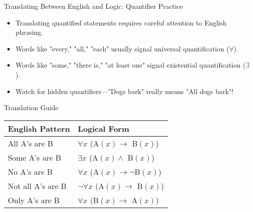 \documentclass{beamer}
\begin{document}
	\begin{frame}{Translating Between English and Logic: Quantifier Practice}
		\begin{itemize}
			\item Translating quantified statements requires careful attention to English phrasing.
			\item Words like "every," "all," "each" usually signal universal quantification ($\forall$).
			\item Words like "some," "there is," "at least one" signal existential quantification ($\exists$).
			\item Watch for hidden quantifiers—"Dogs bark" really means "All dogs bark"!
		\end{itemize}
		
		\begin{block}{Translation Guide}
			\small
			\begin{tabular}{|l|l|}
				\hline
				\textbf{English Pattern} & \textbf{Logical Form} \\
				\hline
				All A's are B & $\forall x$ (A$(x) \rightarrow$ B$(x)$) \\
				Some A's are B & $\exists x$ (A$(x) \land$ B$(x)$) \\
				No A's are B & $\forall x$ (A$(x) \rightarrow \neg$B$(x)$) \\
				Not all A's are B & $\neg\forall x$ (A$(x) \rightarrow$ B$(x)$) \\
				Only A's are B & $\forall x$ (B$(x) \rightarrow$ A$(x)$) \\
				\hline
			\end{tabular}
		\end{block}
	\end{frame}
	
\end{document}
